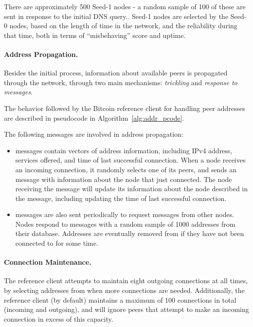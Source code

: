 There are approximately 500 Seed-1 nodes - a random sample of 100 of these are sent in response to the initial DNS query..
Seed-1 nodes are selected by the Seed-0 nodes, based on the length of time in the network, and the reliability during that time, both in terms of ``misbehaving'' score and uptime.

\paragraph{Address Propagation.}
Besides the initial process, information about available peers is propagated through the network, through two main mechanisms: \emph{trickling} and \emph{response to  messages}.

The behavior followed by the Bitcoin reference client for handling peer addresses are described in pseudocode in Algorithm~\ref{alg:addr_pcode}.

The following messages are involved in address propagation:
\begin{itemize}
\item {} messages contain vectors of address information, including IPv4 address, services offered, and time of last successful connection.  
When a node receives an incoming connection, it randomly selects one of its peers, and sends an  message with information about the node that just connected. 
The node receiving the  message will update its information about the node described in the message, including updating the time of last successful connection.
\item {} messages are also sent periodically to request  messages from other nodes.
Nodes respond to  messages with a random sample of 1000 addresses from their  database.
Addresses are eventually removed from  if they have not been connected to for some time.
\end{itemize}

\paragraph{Connection Maintenance.}
The reference client attempts to maintain eight outgoing connections at all times, by selecting addresses from  when more connections are needed. Additionally, the reference client (by default) maintains a maximum of 100 connections in total (incoming and outgoing), and will ignore peers that attempt to make an incoming connection in excess of this capacity.

